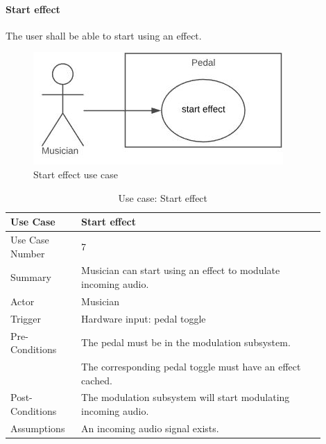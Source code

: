            \paragraph{Start effect} 
            The user shall be able to start using an effect.
            \begin{figure}[!ht]
                \centering
                \includegraphics[width=.5\textwidth]{diagrams/use_cases/uc-effect-start.JPG}
                \caption{Start effect use case}
                \label{fig:uc-start-effect}
            \end{figure}
            \clearpage
            \begin{table}[!ht]
                \centering
                \begin{tabular}{| p{0.2\linewidth} | p{0.7\linewidth} |}
                    \hline
                    Use Case & Start effect \\
                    \hline \hline
                    Use Case Number & 7 \\ \hline
                    Summary & Musician can start using an effect to modulate incoming audio. \\ \hline
                    Actor & Musician \\ \hline
                    Trigger & Hardware input: pedal toggle \\ \hline
                    Pre-Conditions & The pedal must be in the modulation subsystem. \\
                    & The corresponding pedal toggle must have an effect cached. \\ \hline
                    Post-Conditions & The modulation subsystem will start modulating incoming audio. \\ \hline
                    Assumptions & An incoming audio signal exists.\\ \hline
                \end{tabular}
                \\
                \caption{Use case: Start effect}
                \label{tab:uc-start-effect}
            \end{table}     
            
